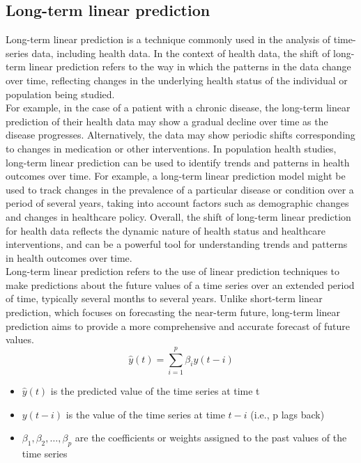 \subsection{Long-term linear prediction} \label{subsec:longlp}
Long-term linear prediction is a technique commonly used in the analysis of time-series data, including health data.
In the context of health data, the shift of long-term linear prediction refers to the way in which the patterns in the
data change over time, reflecting changes in the underlying health status of the individual or population being studied.\\
For example, in the case of a patient with a chronic disease, the long-term linear prediction of their health data may
show a gradual decline over time as the disease progresses. Alternatively, the data may show periodic shifts
corresponding to changes in medication or other interventions. In population health studies, long-term linear
prediction can be used to identify trends and patterns in health outcomes over time. For example, a long-term linear
prediction model might be used to track changes in the prevalence of a particular disease or condition
over a period of several years, taking into account factors such as demographic changes and changes in healthcare policy.
Overall, the shift of long-term linear prediction for health data reflects the dynamic nature of health status and
healthcare interventions, and can be a powerful tool for understanding trends and patterns in health outcomes over time.
\\
Long-term linear prediction refers to the use of linear prediction techniques to make predictions about the future
values of a time series over an extended period of time, typically several months to several years. Unlike short-term
linear prediction, which focuses on forecasting the near-term future, long-term linear prediction aims to provide a more
comprehensive and accurate forecast of future values.
\begin{equation}
    \label{eq:ltlp}
    \hat{y}(t) = \sum_{i=1}^{p} \beta_i y(t-i)
\end{equation}
\begin{itemize}
    \item $\hat{y}(t)$ is the predicted value of the time series at time t
    \item $y(t-i)$ is the value of the time series at time $t-i$ (i.e., p lags back)
    \item $\beta_1, \beta_2, \dots, \beta_p$ are the coefficients or weights assigned to the past values of the time series
\end{itemize}


